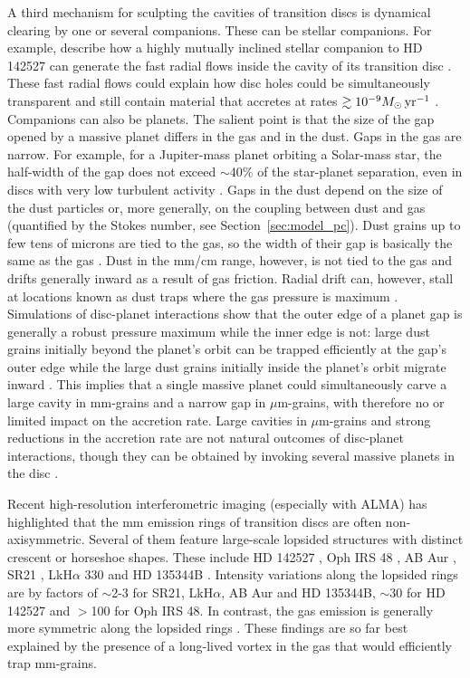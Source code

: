 \documentclass[a4paper,usenatbib]{mnras}
\begin{document}
A third mechanism for sculpting the cavities of transition discs is
dynamical clearing by one or several companions.  These can be stellar
companions. For example, \cite{Casassus15b} describe how a highly
mutually inclined stellar companion to HD 142527 can generate the fast
radial flows inside the cavity of its transition disc
\citep{Rosenfeld14}. These fast radial flows could explain how disc
holes could be simultaneously transparent and still contain material
that accretes at rates $\gtrsim 10^{-9} M_{\odot}\,{\rm yr}^{-1}$
\citep{Rosenfeld14}. Companions can also be planets. The salient point
is that the size of the gap opened by a massive planet differs in the
gas and in the dust. Gaps in the gas are narrow. For example, for a
Jupiter-mass planet orbiting a Solar-mass star, the half-width of the
gap does not exceed $\sim$40$\%$ of the star-planet separation, even
in discs with very low turbulent activity \citep{crida06}. Gaps in the
dust depend on the size of the dust particles or, more generally, on
the coupling between dust and gas (quantified by the Stokes number,
see Section~\ref{sec:model_pc}).  Dust grains up to few tens of
microns are tied to the gas, so the width of their gap is basically
the same as the gas \citep{pm04,Fouchet07,Zhu12}.  Dust in the mm/cm
range, however, is not tied to the gas and drifts generally inward as
a result of gas friction. Radial drift can, however, stall at
locations known as dust traps where the gas pressure is maximum
\citep[e.g.,][]{Pinilla12,JohansenPP6}. Simulations of disc-planet
interactions show that the outer edge of a planet gap is generally a
robust pressure maximum while the inner edge is not: large dust grains
initially beyond the planet's orbit can be trapped efficiently at the
gap's outer edge while the large dust grains initially inside the
planet's orbit migrate inward \citep[e.g.,][]{Zhu12,Zhu14}. This
implies that a single massive planet could simultaneously carve a
large cavity in mm-grains and a narrow gap in $\mu$m-grains, with
therefore no or limited impact on the accretion rate. Large cavities
in $\mu$m-grains and strong reductions in the accretion rate are not
natural outcomes of disc-planet interactions, though they can be
obtained by invoking several massive planets in the disc
\citep{Zhu11}.

Recent high-resolution interferometric imaging (especially with ALMA)
has highlighted that the mm emission rings of transition discs are
often non-axisymmetric. Several of them feature large-scale lopsided
structures with distinct crescent or horseshoe shapes. These include
HD 142527 \citep{Casassus13,Fukagawa14}, Oph IRS 48
\citep{vanderMarel13}, AB Aur \citep{Tang12}, SR21
\citep{Andrews11all,Perez14}, LkH$\alpha$ 330 \citep{Isella13} and HD
135344B \citep{Brown09,Perez14}.  Intensity variations along the
lopsided rings are by factors of $\sim$2-3 for SR21, LkH$\alpha$, AB
Aur and HD 135344B, $\sim$30 for HD 142527 and $>$100 for Oph IRS
48. In contrast, the gas emission is generally more symmetric along
the lopsided rings \citep{vanDishoeck2015}. These findings are so far
best explained by the presence of a long-lived vortex in the gas that
would efficiently trap mm-grains.
\end{document}
